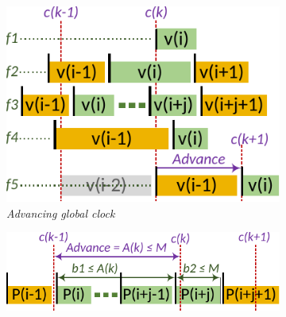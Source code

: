 

\begin{figure}[t]
    \centering
    \vspace{3mm}
    \begin{subfigure}[t]{.46\linewidth}
        \centering
        \includegraphics[width=1\linewidth]{figs/scrr-packet-advance-start.pdf}
        \caption{\small{\textit{Advancing global clock}}}
    	\label{fig:global-clock-start}
    \end{subfigure}
    \begin{minipage}{.50\linewidth}
        \vspace{-20mm}
        \centering
	\begin{subfigure}[t]{1.0\linewidth}
            \centering
            \includegraphics[width=1\linewidth]{figs/scrr-packet-burst-start.pdf}

\end{subfigure}
\end{minipage}
\end{figure}

